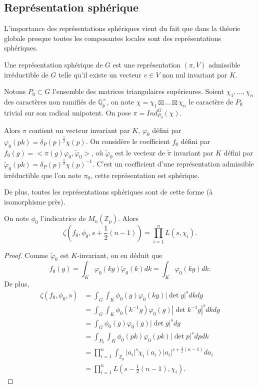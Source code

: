 \subsection{Représentation sphérique}

L'importance des représentations sphériques vient du fait que dans la théorie globale presque toutes les composantes locales sont des représentations sphériques.

\begin{definition}
Une représentation sphérique de $G$ est une représentation $(\pi, V)$ admissible irréductible de $G$ telle qu'il existe un vecteur $v \in V$ non nul invariant par $K$.
\end{definition}

Notons $P_0 \subset G$ l'ensemble des matrices triangulaires supérieures. Soient $\chi_1, ..., \chi_n$ des caractères non ramifiés de $\mathbb{Q}_p^\times$, on note $\chi = \chi_1 \boxtimes ... \boxtimes \chi_n$ le caractère de $P_0$ trivial sur son radical unipotent. On pose $\pi = Ind_{P_0}^G(\chi)$.

Alors $\pi$ contient un vecteur invariant par $K$, $\varphi_0$ défini par $\varphi_0(pk)=\delta_P(p)^{\frac{1}{2}}\chi(p)$. On considère le coefficient $f_0$ défini par $f_0(g)=<\pi(g)\varphi_0, \tilde{\varphi}_0>$, où $\tilde{\varphi}_0$ est le vecteur de $\tilde{\pi}$ invariant par $K$ défini par $\tilde{\varphi}_0(pk)=\delta_P(p)^{\frac{1}{2}}\chi(p)^{-1}$. C'est un coefficient d'une représentation admissible irréductible que l'on note $\pi_0$, cette représentation est sphérique.

De plus, toutes les représentations sphériques sont de cette forme (à isomorphisme près).

\begin{lemme}
\label{lemmespherique}
On note $\phi_0$ l'indicatrice de $M_n(\mathbb{Z}_p)$. Alors
\begin{equation}
\zeta(f_0, \phi_0, s+\frac{1}{2}(n-1)) = \prod_{i=1}^n L(s, \chi_i).
\end{equation}
\end{lemme}

\begin{proof}
Comme $\tilde{\varphi}_0$ est $K$-invariant, on en déduit que
\begin{equation}
f_0(g)=\int_K \varphi_0(kg)\tilde{\varphi}_0(k)dk=\int_K \varphi_0(kg) dk.
\end{equation}
De plus,
\begin{align}
\zeta(f_0, \phi_0, s) &= \int_G \int_K \phi_0(g)\varphi_0(kg)|\det g|^s dkdg \\
&= \int_G \int_K \phi_0(k^{-1}g)\varphi_0(g)|\det k^{-1}g|^s dkdg \\
&= \int_G \phi_0(g)\varphi_0(g)|\det g|^s dg \\
&= \int_{P_0} \int_K \phi_0(pk) \varphi_0(pk) |\det p|^s dp dk \\
&= \prod_{i=1}^n \int_{\mathbb{Z}_p}|a_i|^s\chi_i(a_i) |a_i|^{s+\frac{1}{2}(n-1)}da_i \\
&= \prod_{i=1}^n L(s-\frac{1}{2}(n-1), \chi_i).
\end{align}
\end{proof}

